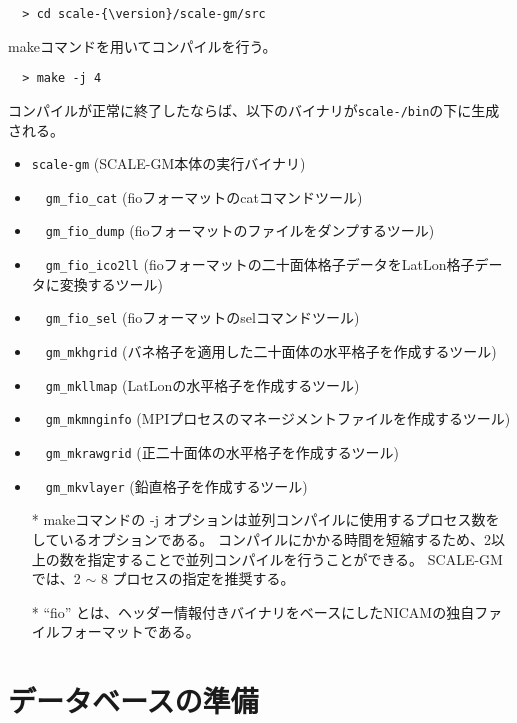 \begin{verbatim}
  > cd scale-{\version}/scale-gm/src
\end{verbatim}

\noindent makeコマンドを用いてコンパイルを行う。
\begin{verbatim}
  > make -j 4
\end{verbatim}
コンパイルが正常に終了したならば、以下のバイナリが\texttt{scale-{\version}/bin}の下に生成される。
 \begin{itemize}
   \item \verb|scale-gm| (SCALE-GM本体の実行バイナリ)
   \item　\verb|gm_fio_cat| (fioフォーマットのcatコマンドツール)
   \item　\verb|gm_fio_dump| (fioフォーマットのファイルをダンプするツール)
   \item　\verb|gm_fio_ico2ll| (fioフォーマットの二十面体格子データをLatLon格子データに変換するツール)
   \item　\verb|gm_fio_sel| (fioフォーマットのselコマンドツール)
   \item　\verb|gm_mkhgrid| (バネ格子を適用した二十面体の水平格子を作成するツール)
   \item　\verb|gm_mkllmap| (LatLonの水平格子を作成するツール)
   \item　\verb|gm_mkmnginfo| (MPIプロセスのマネージメントファイルを作成するツール)
   \item　\verb|gm_mkrawgrid| (正二十面体の水平格子を作成するツール)
   \item　\verb|gm_mkvlayer| (鉛直格子を作成するツール)
 \end{itemize}

\begin{itemize}
  \item[*] makeコマンドの -j オプションは並列コンパイルに使用するプロセス数をしているオプションである。
   コンパイルにかかる時間を短縮するため、2以上の数を指定することで並列コンパイルを行うことができる。
   SCALE-GMでは、2 $\sim$ 8 プロセスの指定を推奨する。
  \item[*] ``fio'' とは、ヘッダー情報付きバイナリをベースにしたNICAMの独自ファイルフォーマットである。
\end{itemize}


\section{データベースの準備}


